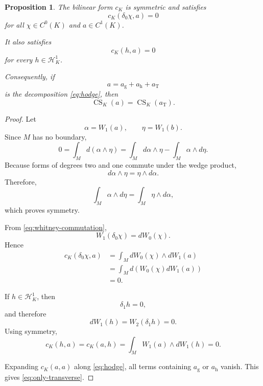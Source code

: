 \documentclass[10pt,a4paper]{amsart}
\newtheorem{proposition}{Proposition}
\newcommand{\CS}{\operatorname{CS}}
\begin{document}
\begin{proposition}
\label{prop:gauge-harmonic}
The bilinear form \(c_K\) is symmetric and satisfies
\begin{equation}
c_K(\delta_0\chi,a)=0
\label{eq:exact-annihilation}
\end{equation}
for all \(\chi\in C^0(K)\) and \(a\in C^1(K)\).

It also satisfies
\begin{equation}
c_K(h,a)=0
\label{eq:harmonic-annihilation}
\end{equation}
for every \(h\in\mathcal H_K^1\).

Consequently, if
\begin{equation}
a=a_{\mathrm g}+a_{\mathrm h}+a_{\mathrm T}
\end{equation}
is the decomposition \eqref{eq:hodge}, then
\begin{equation}
\CS_K(a)
=
\CS_K(a_{\mathrm T}).
\label{eq:only-transverse}
\end{equation}
\end{proposition}

\begin{proof}
Let
\begin{equation}
\alpha=W_1(a),
\qquad
\eta=W_1(b).
\end{equation}
Since \(M\) has no boundary,
\begin{equation}
0
=
\int_M d(\alpha\wedge\eta)
=
\int_M d\alpha\wedge\eta
-
\int_M\alpha\wedge d\eta.
\end{equation}
Because forms of degrees two and one commute under the wedge
product,
\begin{equation}
d\alpha\wedge\eta
=
\eta\wedge d\alpha.
\end{equation}
Therefore,
\begin{equation}
\int_M\alpha\wedge d\eta
=
\int_M\eta\wedge d\alpha,
\end{equation}
which proves symmetry.

From \eqref{eq:whitney-commutation},
\begin{equation}
W_1(\delta_0\chi)
=
dW_0(\chi).
\end{equation}
Hence
\begin{align}
c_K(\delta_0\chi,a)
&=
\int_M
dW_0(\chi)\wedge dW_1(a)
\nonumber\\
&=
\int_M
d\left(
W_0(\chi)dW_1(a)
\right)
\nonumber\\
&=
0.
\end{align}

If \(h\in\mathcal H_K^1\), then
\begin{equation}
\delta_1h=0,
\end{equation}
and therefore
\begin{equation}
dW_1(h)
=
W_2(\delta_1h)
=
0.
\end{equation}
Using symmetry,
\begin{equation}
c_K(h,a)
=
c_K(a,h)
=
\int_M
W_1(a)\wedge dW_1(h)
=
0.
\end{equation}

Expanding \(c_K(a,a)\) along \eqref{eq:hodge}, all terms
containing \(a_{\mathrm g}\) or \(a_{\mathrm h}\) vanish.
This gives \eqref{eq:only-transverse}.
\end{proof}
\end{document}

